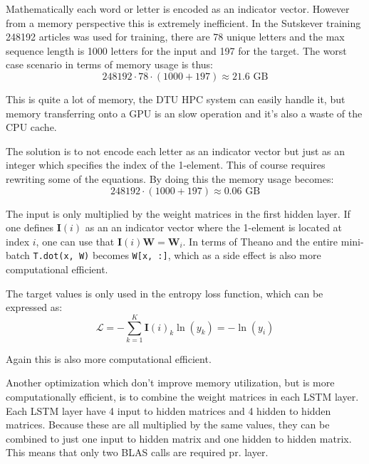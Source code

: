 Mathematically each word or letter is encoded as an indicator vector. However from a memory perspective this is extremely inefficient. In the Sutskever training 248192 articles was used for training, there are 78 unique letters and the max sequence length is 1000 letters for the input and 197 for the target. The worst case scenario in terms of memory usage is thus:
\begin{equation}
248192 \cdot 78 \cdot (1000 + 197) \approx 21.6 \text{ GB}
\end{equation}

This is quite a lot of memory, the DTU HPC system can easily handle it, but memory transferring onto a GPU is an slow operation and it's also a waste of the CPU cache.

The solution is to not encode each letter as an indicator vector but just as an integer which specifies the index of the 1-element. This of course requires rewriting some of the equations. By doing this the memory usage becomes:
\begin{equation}
248192 \cdot (1000 + 197) \approx 0.06 \text{ GB}
\end{equation}

The input is only multiplied by the weight matrices in the first hidden layer. If one defines $\mathbf{I}(i)$ as an an indicator vector where the 1-element is located at index $i$, one can use that $\mathbf{I}(i) \mathbf{W} = \mathbf{W}_{i}$. In terms of Theano and the entire mini-batch \texttt{T.dot(x, W)} becomes \texttt{W[x, :]}, which as a side effect is also more computational efficient.

The target values is only used in the entropy loss function, which can be expressed as:
\begin{equation}
\mathcal{L} = - \sum_{k=1}^K \mathbf{I}(i)_k \ln(y_k) = - \ln(y_i)
\end{equation}

Again this is also more computational efficient.

Another optimization which don't improve memory utilization, but is more computationally efficient, is to combine the weight matrices in each LSTM layer. Each LSTM layer have 4 input to hidden matrices and 4 hidden to hidden matrices. Because these are all multiplied by the same values, they can be combined to just one input to hidden matrix and one hidden to hidden matrix. This means that only two BLAS calls are required pr. layer.
